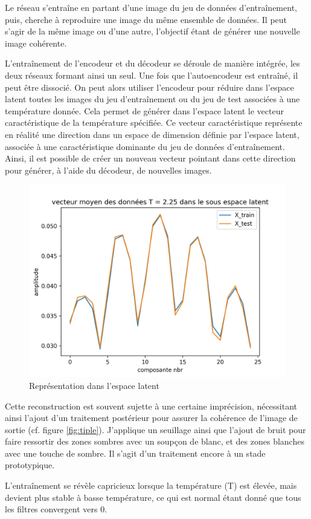 \documentclass[11pt, parskip=half]{scrartcl} %
\begin{document}
Le réseau s'entraîne en partant d'une image du jeu de données d'entraînement, puis, cherche à reproduire une image du même ensemble de données. Il peut s'agir de la même image ou d'une autre, l'objectif étant de générer une nouvelle image cohérente.

L'entraînement de l'encodeur et du décodeur se déroule de manière intégrée, les deux réseaux formant ainsi un seul. Une fois que l'autoencodeur est entraîné, il peut être dissocié. On peut alors utiliser l'encodeur pour réduire dans l'espace latent toutes les images du jeu d'entraînement ou du jeu de test associées à une température donnée. Cela permet de générer dans l'espace latent le vecteur caractéristique de la température spécifiée. Ce vecteur caractéristique représente en réalité une direction dans un espace de dimension définie par l'espace latent, associée à une caractéristique dominante du jeu de données d'entraînement. Ainsi, il est possible de créer un nouveau vecteur pointant dans cette direction pour générer, à l'aide du décodeur, de nouvelles images.

\begin{figure}[h]
	\centering
	\includegraphics[width=0.5\linewidth]{./figures/latent.jpg}
	\caption{Représentation dans l'espace latent}
	\label{fig:latent}
\end{figure}

Cette reconstruction est souvent sujette à une certaine imprécision, nécessitant ainsi l'ajout d'un traitement postérieur pour assurer la cohérence de l'image de sortie (cf. figure \ref{fig:tiple}). J'applique un seuillage ainsi que l'ajout de bruit pour faire ressortir des zones sombres avec un soupçon de blanc, et des zones blanches avec une touche de sombre. Il s'agit d'un traitement encore à un stade prototypique.

L'entraînement se révèle capricieux lorsque la température (T) est élevée, mais devient plus stable à basse température, ce qui est normal étant donné que tous les filtres convergent vers 0.
\end{document}
